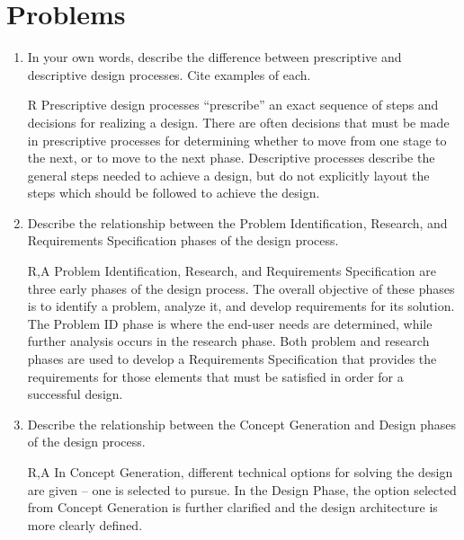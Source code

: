 \section{Problems}
\label{problems}

\begin{enumerate}
\itemsep0em 
\def\labelenumi{\arabic{enumi}.}
\item
  In your own words, describe the difference between prescriptive and
  descriptive design processes. Cite examples of each.\\
  \begin{solution}{R}{
Prescriptive design processes “prescribe” an exact sequence of steps and decisions for
realizing a design. There are often decisions that must be made in prescriptive processes for
determining whether to move from one stage to the next, or to move to the next phase.
Descriptive processes describe the general steps needed to achieve a design, but do not
explicitly layout the steps which should be followed to achieve the design.}
\end{solution}
  
\item
  Describe the relationship between the Problem Identification,
  Research, and Requirements Specification phases of the design process.\\
\begin{solution}{R,A}{
Problem Identification, Research, and Requirements Specification are three early phases of
the design process. The overall objective of these phases is to identify a problem, analyze it,
and develop requirements for its solution. The Problem ID phase is where the end-user needs
are determined, while further analysis occurs in the research phase. Both problem and
research phases are used to develop a Requirements Specification that provides the
requirements for those elements that must be satisfied in order for a successful design.}
\end{solution}
  
\item
  Describe the relationship between the Concept Generation and Design
  phases of the design process.\\
\begin{solution}{R,A}{
  In Concept Generation, different technical options for solving the design are given – one is
selected to pursue. In the Design Phase, the option selected from Concept Generation is
further clarified and the design architecture is more clearly defined.
}
\end{solution}
  

\end{enumerate}
